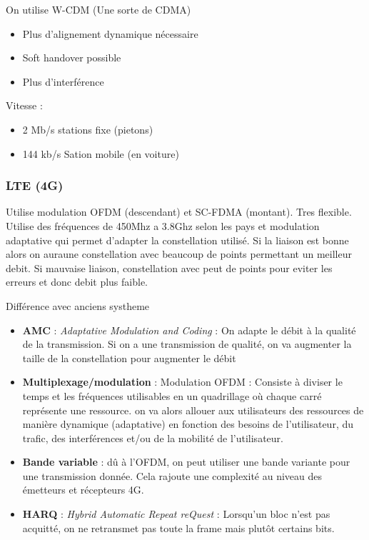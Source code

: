 \documentclass[12pt]{article}
\begin{document}
 			On utilise W-CDM (Une sorte de CDMA)
 			\begin{itemize}
 				\item Plus d'alignement dynamique nécessaire
 				\item Soft handover possible
 				\item Plus d'interférence
 			\end{itemize}
 			
 			Vitesse :
 			\begin{itemize}
 				\item 2 Mb/s stations fixe (pietons)
 				\item 144 kb/s Sation mobile (en voiture)
 			\end{itemize}
 			
 		\subsubsection{LTE (4G)}
 			Utilise modulation OFDM (descendant) et SC-FDMA (montant). Tres flexible. Utilise des fréquences de 450Mhz a 3.8Ghz selon les pays et modulation adaptative qui permet d'adapter la constellation utilisé. Si la liaison est bonne alors on auraune constellation avec beaucoup de points permettant un meilleur debit. Si mauvaise liaison, constellation avec peut de points pour eviter les erreurs et donc debit plus faible.
 			
 			Différence avec anciens systheme
 			\begin{itemize}
 				\item \textbf{AMC} : \textit{Adaptative Modulation and Coding} : On adapte le débit à la qualité de la transmission. Si on a une transmission de qualité, on va augmenter la taille de la constellation pour augmenter le débit
 				\item \textbf{Multiplexage/modulation} : Modulation OFDM : Consiste à diviser le temps et les fréquences utilisables en un quadrillage où chaque carré représente une ressource. on va alors allouer aux utilisateurs des ressources de manière dynamique (adaptative) en fonction des besoins de l’utilisateur, du trafic, des interférences et/ou de la mobilité de l’utilisateur.
 				\item \textbf{Bande variable} : dû à l’OFDM, on peut utiliser une bande variante pour une transmission donnée. Cela rajoute une complexité au niveau des émetteurs et récepteurs 4G. 
 				\item \textbf{HARQ} : \textit{Hybrid Automatic Repeat reQuest} : Lorsqu’un bloc n’est pas acquitté, on ne retransmet pas toute la frame mais plutôt certains bits.
 			\end{itemize}
 			
\end{document}
